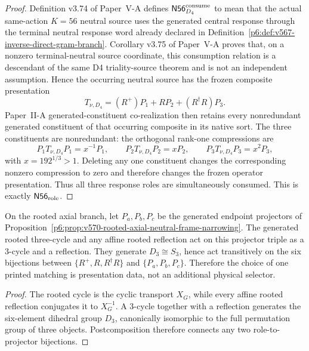 \documentclass[12pt,a4paper]{article}
\begin{document}
\begin{proof}
Definition v3.74 of Paper~V-A defines
\(\mathsf{N56}_{D_4}^{\rm consume}\) to mean that the actual same-action
\(K=56\) neutral source uses the generated central response through the
terminal neutral response word already declared in
Definition~\ref{p6:def:v567-inverse-direct-gram-branch}.  Corollary v3.75 of
Paper~V-A proves that, on a nonzero terminal-neutral source coordinate, this
consumption relation is a descendant of the same D4 triality-source theorem
and is not an independent assumption.  Hence the occurring neutral source has
the frozen composite presentation
\[
 T_{\nu,D_4}=(R^+)P_1+RP_2+(R^\dagger R)P_3.
\]
Paper~II-A generated-constituent co-realization then retains every
nonredundant generated constituent of that occurring composite in its native
sort.  The three constituents are nonredundant: the orthogonal rank-one
compressions are
\[
 P_1T_{\nu,D_4}P_1=x^{-1}P_1,\qquad
 P_2T_{\nu,D_4}P_2=xP_2,\qquad
 P_3T_{\nu,D_4}P_3=x^2P_3,
\]
with \(x=192^{1/3}>1\).  Deleting any one constituent changes the
corresponding nonzero compression to zero and therefore changes the frozen
operator presentation.  Thus all three response roles are simultaneously
consumed.  This is exactly \(\mathsf{N56}_{\rm role}\).
\end{proof}

\begin{proposition}
\label{p6:prop:v574-rooted-role-matching-orbit}
On the rooted axial branch, let \(P_a,P_b,P_c\) be the generated endpoint
projectors of Proposition~\ref{p6:prop:v570-rooted-axial-neutral-frame-narrowing}.
The generated rooted three-cycle and any affine rooted reflection act on this
projector triple as a 3-cycle and a reflection.  They generate
\(D_3\cong S_3\), hence act transitively on the six bijections between
\(\{R^+,R,R^\dagger R\}\) and \(\{P_a,P_b,P_c\}\).  Therefore the
choice of one printed matching is presentation data, not an additional
physical selector.
\end{proposition}

\begin{proof}
The rooted cycle is the cyclic transport \(X_G\), while every affine rooted
reflection conjugates it to \(X_G^{-1}\).  A 3-cycle together with a
reflection generates the six-element dihedral group \(D_3\), canonically
isomorphic to the full permutation group of three objects.  Postcomposition
therefore connects any two role-to-projector bijections.
\end{proof}
\end{document}
